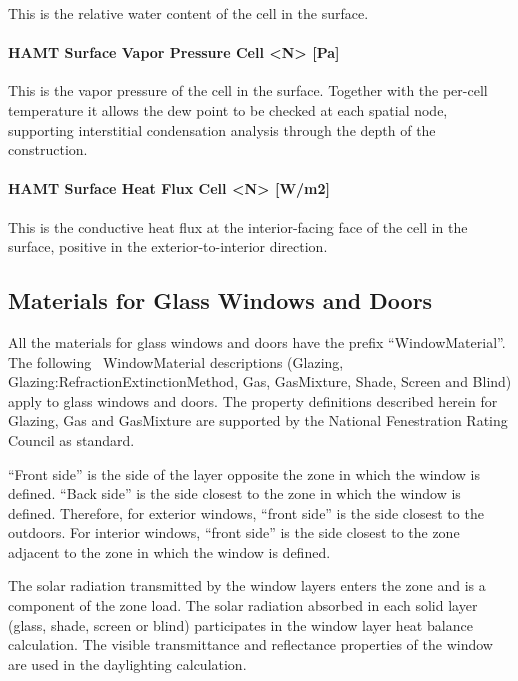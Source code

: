 This is the relative water content of the cell in the surface.

\paragraph{HAMT Surface Vapor Pressure Cell \textless{}N\textgreater{} {[}Pa{]}}\label{hamt-surface-vapor-pressure-cell-n-pa}

This is the vapor pressure of the cell in the surface. Together with the per-cell temperature it allows the dew point to be checked at each spatial node, supporting interstitial condensation analysis through the depth of the construction.

\paragraph{HAMT Surface Heat Flux Cell \textless{}N\textgreater{} {[}W/m2{]}}\label{hamt-surface-heat-flux-cell-n-wm2}

This is the conductive heat flux at the interior-facing face of the cell in the surface, positive in the exterior-to-interior direction.

\subsection{Materials for Glass Windows and Doors}\label{materials-for-glass-windows-and-doors}

All the materials for glass windows and doors have the prefix ``WindowMaterial''. The following~ WindowMaterial descriptions (Glazing, Glazing:RefractionExtinctionMethod, Gas, GasMixture, Shade, Screen and Blind) apply to glass windows and doors. The property definitions described herein for Glazing, Gas and GasMixture are supported by the National Fenestration Rating Council as standard.

``Front side'' is the side of the layer opposite the zone in which the window is defined. ``Back side'' is the side closest to the zone in which the window is defined. Therefore, for exterior windows, ``front side'' is the side closest to the outdoors. For interior windows, ``front side'' is the side closest to the zone adjacent to the zone in which the window is defined.

The solar radiation transmitted by the window layers enters the zone and is a component of the zone load. The solar radiation absorbed in each solid layer (glass, shade, screen or blind) participates in the window layer heat balance calculation. The visible transmittance and reflectance properties of the window are used in the daylighting calculation.

